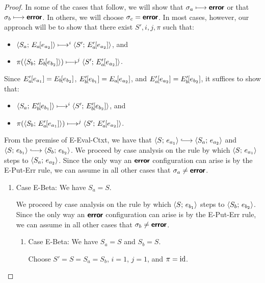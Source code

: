 \begin{proof}
  In some of the cases that follow, we will show that $\sigma_a
  \longmapsto \textbf{\textsf{error}}$ or that $\sigma_b \longmapsto \textbf{\textsf{error}}$.  In
  others, we will choose $\sigma_c = \textbf{\textsf{error}}$.  In most cases, however,
  our approach will be to show that there exist $S', i, j, \pi$ such
  that:
  \begin{itemize}
  \item $\langle S_a;\, E_a\hspace{-1mm}\left[e_{a_2}\right] \rangle \longmapsto^i
    \langle S';\, E'_a\hspace{-1mm}\left[e_{a_2}\right] \rangle$, and
  \item $\pi(\langle S_b;\, E_b\hspace{-1mm}\left[e_{b_2}\right] \rangle) \longmapsto^j
    \langle S';\, E'_a\hspace{-1mm}\left[e_{a_2}\right] \rangle$.
  \end{itemize}
  Since $E'_a\hspace{-1mm}\left[e_{a_1}\right] = E_b\hspace{-1mm}\left[e_{b_2}\right]$,
  $E'_b\hspace{-1mm}\left[e_{b_1}\right] = E_a\hspace{-1mm}\left[e_{a_2}\right]$, and
  $E'_a\hspace{-1mm}\left[e_{a_2}\right] = E'_b\hspace{-1mm}\left[e_{b_2}\right]$, it suffices
  to show that:
  \begin{itemize}
  \item $\langle S_a;\, E'_b\hspace{-1mm}\left[e_{b_1}\right] \rangle \longmapsto^i
    \langle S';\, E'_b\hspace{-1mm}\left[e_{b_2}\right] \rangle$, and
  \item $\pi(\langle S_b;\, E'_a\hspace{-1mm}\left[e_{a_1}\right] \rangle) \longmapsto^j
    \langle S';\, E'_a\hspace{-1mm}\left[e_{a_2}\right] \rangle$.
  \end{itemize}

  From the premise of {\sc E-Eval-Ctxt}, we have that
  $\config{S}{e_{a_1}} \parstepsto \config{S_a}{e_{a_2}}$ and
  $\config{S}{e_{b_1}} \parstepsto \config{S_b}{e_{b_2}}$.  We proceed
  by case analysis on the rule by which $\langle S;\, e_{a_1} \rangle$ steps to
  $\langle S_a;\, e_{a_2} \rangle$.  Since the only way an $\textbf{\textsf{error}}$
  configuration can arise is by the {\sc E-Put-Err} rule, we can
  assume in all other cases that $\sigma_a \neq \textbf{\textsf{error}}$.

  \begin{enumerate}
  \item Case {\sc E-Beta}: We have $S_a = S$.

    We proceed by case analysis on the rule by which
    $\langle S;\, e_{b_1} \rangle$ steps to $\langle S_b;\, e_{b_2} \rangle$.  Since the
    only way an $\textbf{\textsf{error}}$ configuration can arise is by the {\sc
      E-Put-Err} rule, we can assume in all other cases that $\sigma_b
    \neq \textbf{\textsf{error}}$.
    \begin{enumerate}
    \item \label{slqc-beta-beta}Case {\sc E-Beta}: We have $S_a = S$
      and $S_b = S$.

      Choose $S' = S = S_a = S_b$, $i = 1$, $j = 1$, and $\pi = \mathrm{id}$.


\end{enumerate}
\end{enumerate}
\end{proof}

